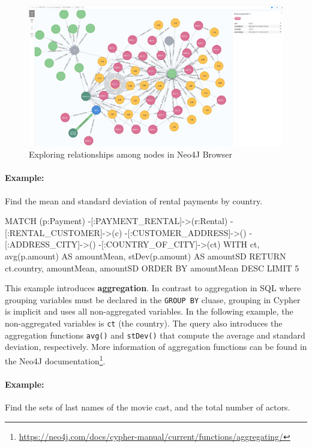 \begin{figure}
\includegraphics[width=\textwidth]{screen14.png}
\caption{Exploring relationships among nodes in Neo4J Browser}
\label{fig:explorerelationships}
\end{figure}

\paragraph*{Example:} Find the mean and standard deviation of rental payments by country.

\begin{samepage}
\begin{cyphercode}
MATCH (p:Payment) 
        -[:PAYMENT_RENTAL]->(r:Rental) 
        -[:RENTAL_CUSTOMER]->(c) 
        -[:CUSTOMER_ADDRESS]->() 
        -[:ADDRESS_CITY]->()
        -[:COUNTRY_OF_CITY]->(ct)
WITH ct, 
     avg(p.amount) AS amountMean, 
     stDev(p.amount) AS amountSD
RETURN ct.country, amountMean, amountSD
ORDER BY amountMean DESC LIMIT 5
\end{cyphercode}
\end{samepage}

This example introduces \textbf{aggregation}. In contrast to aggregation in SQL where grouping variables must be declared in the \texttt{GROUP BY} cluase, grouping in Cypher is implicit and uses all non-aggregated variables. In the following example, the non-aggregated variables is \texttt{ct} (the country). The query also introduces the aggregation functions \texttt{avg()} and \texttt{stDev()} that compute the average and standard deviation, respectively. More information of aggregation functions can be found in the Neo4J documentation\footnote{\url{https://neo4j.com/docs/cypher-manual/current/functions/aggregating/}}.

\paragraph*{Example:} Find the sets of last names of the movie cast, and the total number of actors.

